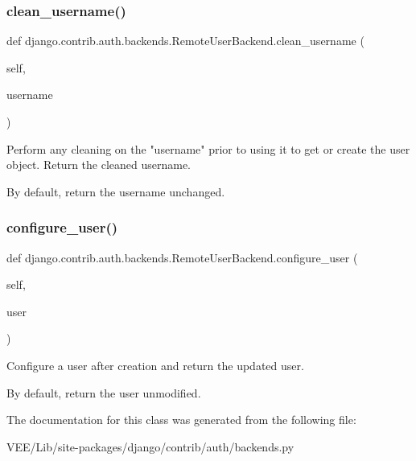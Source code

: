 \subsubsection{\texorpdfstring{clean\+\_\+username()}{clean\_username()}}
{\footnotesize\ttfamily def django.\+contrib.\+auth.\+backends.\+Remote\+User\+Backend.\+clean\+\_\+username (\begin{DoxyParamCaption}\item[{}]{self,  }\item[{}]{username }\end{DoxyParamCaption})}

\begin{DoxyVerb}Perform any cleaning on the "username" prior to using it to get or
create the user object.  Return the cleaned username.

By default, return the username unchanged.
\end{DoxyVerb}
 \mbox{\label{classdjango_1_1contrib_1_1auth_1_1backends_1_1_remote_user_backend_a510c1101bacdfbd232704add825de866}} 
\subsubsection{\texorpdfstring{configure\+\_\+user()}{configure\_user()}}
{\footnotesize\ttfamily def django.\+contrib.\+auth.\+backends.\+Remote\+User\+Backend.\+configure\+\_\+user (\begin{DoxyParamCaption}\item[{}]{self,  }\item[{}]{user }\end{DoxyParamCaption})}

\begin{DoxyVerb}Configure a user after creation and return the updated user.

By default, return the user unmodified.
\end{DoxyVerb}
 

The documentation for this class was generated from the following file\+:\begin{DoxyCompactItemize}
\item 
V\+E\+E/\+Lib/site-\/packages/django/contrib/auth/backends.\+py\end{DoxyCompactItemize}
